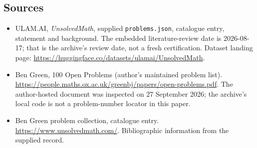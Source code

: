 \documentclass[11pt,a4paper]{article}
\begin{document}
\subsection{Sources}

{\small

\begin{itemize}

\item[\hypertarget{source:statement:1}{S1}] ULAM.AI, \emph{UnsolvedMath}, supplied \texttt{problems.json}, catalogue entry, statement and background. The embedded literature-review date is 2026-08-17; that is the archive’s review date, not a fresh certification. Dataset landing page: \url{https://huggingface.co/datasets/ulamai/UnsolvedMath}.

\item[\hypertarget{source:statement:2}{S2}] Ben Green, 100 Open Problems (author’s maintained problem list). \url{https://people.maths.ox.ac.uk/greenbj/papers/open-problems.pdf}. The author-hosted document was inspected on 27 September 2026; the archive’s local code is not a problem-number locator in this paper.

\item[\hypertarget{source:statement:3}{S3}] Ben Green problem collection, catalogue entry. \url{https://www.unsolvedmath.com/}. Bibliographic information from the supplied record.

\end{itemize}

}

\label{end:statement}
\end{document}
